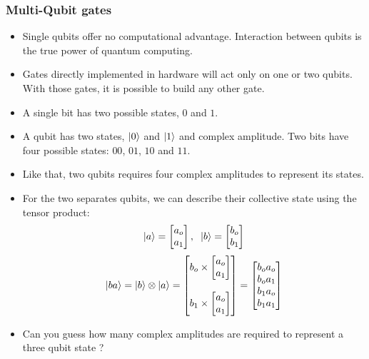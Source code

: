 \documentclass{article}
\begin{document}
\subsubsection{Multi-Qubit gates}
\begin{itemize}
    \item Single qubits offer no computational advantage. Interaction between qubits is the true power of quantum computing.
    \item Gates directly implemented in hardware will act only on one or two  qubits. With those gates, it is possible to build any other gate.
    \item A single bit has two possible states, $0$ and $1$.
    \item A qubit has two states, $\ket{0}$ and $\ket{1}$ and complex amplitude. Two bits have four possible states: $00$, $01$, $10$ and $11$.
    \item Like that, two qubits requires four complex amplitudes to represent its states.
    \item For the two separates qubits, we can describe their collective state using the tensor product:
    \begin{equation*}
        \ket{a} = \begin{bmatrix}
            a_{o} \\ a_{1}
        \end{bmatrix}, \hspace{0.2cm} \ket{b} = \begin{bmatrix}
            b_{o} \\ b_{1}
        \end{bmatrix} 
    \end{equation*}
    \vspace{0.1cm}
    \begin{equation}
        \ket{ba} = \ket{b} \otimes \ket{a} = \begin{bmatrix}
            b_{o} \times \begin{bmatrix}
            a_{o} \\ a_{1}
        \end{bmatrix} \\ \\ b_{1} \times \begin{bmatrix}
            a_{o} \\ a_{1}
        \end{bmatrix}
        \end{bmatrix} = \begin{bmatrix}
            b_{o}a_{o}\\b_{o}a_{1}\\b_{1}a_{o}\\b_{1}a_{1}
        \end{bmatrix}
    \end{equation}
    \item Can you guess how many complex amplitudes are required to represent a three qubit state ?
\end{itemize}
\end{document}
